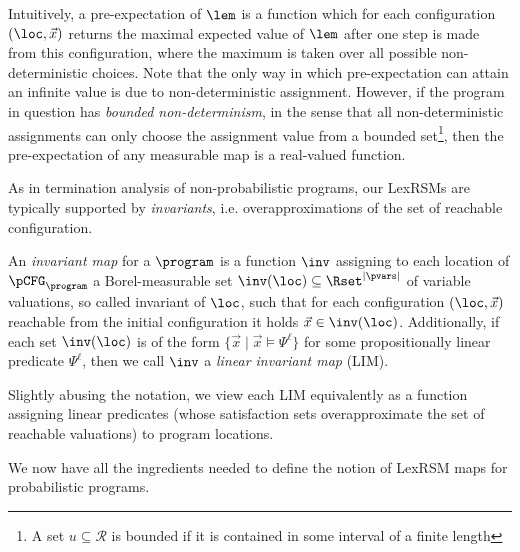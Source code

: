 Intuitively, a pre-expectation of $\lem$ is a 
function which for each configuration $(\loc,\vec{x})$ returns the maximal
expected value of $\lem$ after one step is made from this configuration, where 
the maximum is taken over all possible non-deterministic choices.
Note that the only way in which pre-expectation can attain an infinite value is due to non-deterministic assignment. However, if the program in question has \emph{bounded non-determinism}, in the sense that all non-deterministic assignments can only choose the assignment value from a bounded set\footnote{A set $u \subseteq \mathcal{R}$ is bounded if it is contained in some interval of a finite length}, then the pre-expectation of any measurable map is a real-valued function.

As in termination analysis of non-probabilistic programs, our LexRSMs are typically supported by \emph{invariants}, i.e. overapproximations of the set of reachable configuration. 

\begin{definition}
An \emph{invariant map} for a \PP{} $\program$ is a function $\inv$ assigning to each location of $\pCFG_{\program}$ a Borel-measurable set $\inv({\loc})\subseteq \Rset^{|\pvars|}$ of variable valuations, so called invariant of $\loc$, such that for each configuration $(\loc,\vec{x})$ reachable from the initial configuration it holds $\vec{x}\in \inv(\loc)$. Additionally, if each set $\inv(\loc)$ is of the form $\{\vec{x}\mid\vec{x}\models \Psi^\ell \}$ for some propositionally linear predicate $\Psi^\ell$, then we call $\inv$ a \emph{linear invariant map} (LIM).
\end{definition}

Slightly abusing the notation, we view each LIM equivalently as a function assigning linear predicates (whose satisfaction sets overapproximate the set of reachable valuations) to program locations.

We now have all the ingredients needed to define the notion of LexRSM maps for probabilistic programs.


